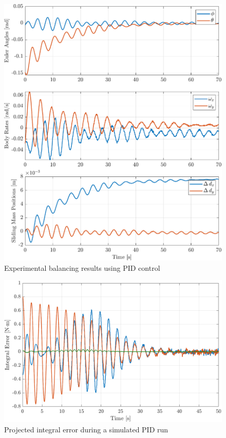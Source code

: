 \begin{figure}[p!]
    \centering
    \includegraphics[width=\linewidth]{plots/PID_hardware_results.pdf}
    \caption{Experimental balancing results using PID control}
    \label{fig:PID_hardware_results}
\end{figure}

\begin{figure}[h]
    \centering
    \includegraphics[width=0.9\linewidth]{plots/PID_sim_integral_error.png}
    \caption{Projected integral error during a simulated PID run}
    \label{fig:PID_sim_integral_error}
\end{figure}

